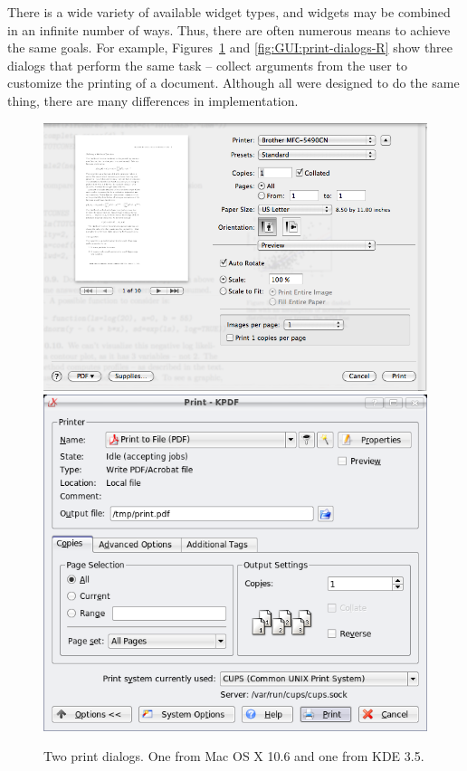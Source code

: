 There is a wide variety of available widget types, and widgets may be
combined in an infinite number of ways. Thus, there are often numerous
means to achieve the same goals. For example,
Figures~\ref{fig:GUI:print-dialogs} and \ref{fig:GUI:print-dialogs-R} show three dialogs that perform
the same task -- collect arguments from the user to customize the
printing of a document. Although all were designed to do the same
thing, there are many differences in implementation.



\begin{figure}
  \centering
  \includegraphics[width=.80\textwidth]{fig-mac-print}
   \\
   
  \includegraphics[width=.80\textwidth]{kde-print}
  \caption{Two print dialogs. One from Mac OS X 10.6 and one from KDE 3.5.}
  \label{fig:GUI:print-dialogs}
\end{figure}


